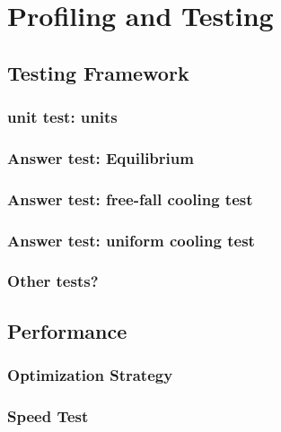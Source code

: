 \section{Profiling and Testing} \label{sec:profiling-and-testing}



\subsection{Testing Framework}


\subsubsection{unit test: units}

\subsubsection{Answer test: Equilibrium}

\subsubsection{Answer test: free-fall cooling test}

\subsubsection{Answer test: uniform cooling test}

\subsubsection{Other tests?}


\subsection{Performance}


\subsubsection{Optimization Strategy}


\subsubsection{Speed Test}
